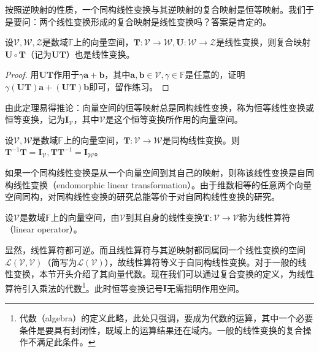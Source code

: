 \documentclass[main.tex]{subfiles}
\begin{document}
按照逆映射的性质，一个同构线性变换与其逆映射的复合映射是恒等映射。我们于是要问：两个线性变换形成的复合映射是线性变换吗？答案是肯定的。

\begin{theorem}\label{thm:II.4.7}
设$\mathcal{V},\mathcal{W},\mathcal{Z}$是数域$\mathbb{F}$上的向量空间，$\mathbf{T}:\mathcal{V}\rightarrow\mathcal{W},\mathbf{U}:\mathcal{W}\rightarrow\mathcal{Z}$是线性变换，则复合映射$\mathbf{U}\circ\mathbf{T}$（记为$\mathbf{UT}$）也是线性变换。
\end{theorem}
\begin{proof}
用$\mathbf{UT}$作用于$\gamma\mathbf{a}+\mathbf{b}$，其中$\mathbf{a},\mathbf{b}\in\mathcal{V},\gamma\in\mathbb{F}$是任意的，证明$\gamma\left(\mathbf{UT}\right)\mathbf{a}+\left(\mathbf{UT}\right)\mathbf{b}$即可，留作练习。
\end{proof}

由此定理易得推论：向量空间的恒等映射总是同构线性变换，称为恒等线性变换或恒等变换，记为$\mathbf{I}_\mathcal{V}$，其中$\mathcal{V}$是这个恒等变换所作用的向量空间。

\begin{example}
设$\mathcal{V},\mathcal{W}$是数域$\mathbb{F}$上的向量空间，$\mathbf{T}:\mathcal{V}\rightarrow\mathcal{W}$是同构线性变换。则$\mathbf{T}^{-1}\mathbf{T}=\mathbf{I}_\mathcal{V},\mathbf{TT}^{-1}=\mathbf{I}_\mathcal{W}$。
\end{example}

如果一个同构线性变换是从一个向量空间到其自己的映射，则称该线性变换是自同构线性变换（endomorphic linear transformation）。由于维数相等的任意两个向量空间同构，对同构线性变换的研究总能等价于对自同构线性变换的研究。

\begin{definition}[线性算符]\label{def:II.4.3}
设$\mathcal{V}$是数域$\mathbb{F}$上的向量空间，由$\mathcal{V}$到其自身的线性变换$\mathbf{T}:\mathcal{V}\rightarrow\mathcal{V}$称为线性算符（linear operator）。
\end{definition}

显然，线性算符都可逆。而且线性算符与其逆映射都同属同一个线性变换的空间$\mathcal{L}\left(\mathcal{V},\mathcal{V}\right)$（简写为$\mathcal{L}\left(\mathcal{V}\right)$），故线性算符等义于自同构线性变换。对于一般的线性变换，本节开头介绍了其向量代数。现在我们可以通过复合变换的定义，为线性算符引入乘法的代数\footnote{代数（algebra）的定义此略，此处只强调，要成为代数的运算，其中一个必要条件是要具有封闭性，既域上的运算结果还在域内。一般的线性变换的复合操作不满足此条件。}。此时恒等变换记号$\mathbf{I}$无需指明作用空间。
\end{document}
